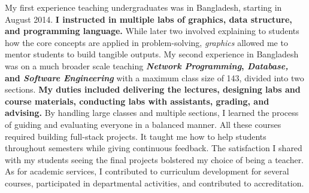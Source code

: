 \documentclass[9pt]{article}
\newcommand{\textcourse}[1]{\textit{#1}}
\begin{document}
My first experience teaching undergraduates was in Bangladesh, starting in August 2014. 
\textbf{I instructed in multiple labs of graphics, data structure, and programming language.} While later two involved explaining to students how the core concepts are applied in problem-solving, \textit{graphics} allowed me to mentor students to build tangible outputs. My second experience in Bangladesh was on a much broader scale 
teaching \textbf{\textcourse{Network Programming}, \textit{Database,} and \textit{Software Engineering}}
with a maximum class size of 143, divided into two sections. 
\textbf{My duties included delivering the lectures, designing labs and course materials, conducting labs with assistants, grading, and advising.}
By handling large classes and multiple sections, I learned the process of guiding and evaluating everyone in a balanced manner.
All these courses required building full-stack projects. It taught me how to help students throughout semesters while giving continuous feedback. The satisfaction I shared with my students seeing the final projects
bolstered my choice of being a teacher. As for academic services,
I contributed to curriculum development for several courses, participated in departmental activities, and
contributed to accreditation.
\end{document}
